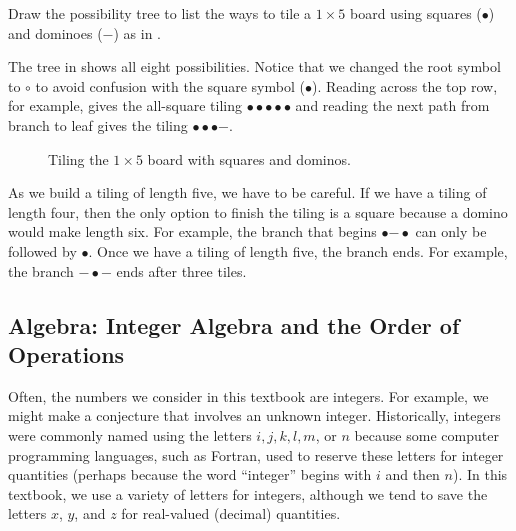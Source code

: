 \begin{exam}
\label{exam_sq_dom5_tree}
    Draw the possibility tree to list the ways to tile a $1 \times 5$ board using squares ($\bullet$) and dominoes ($\boldsymbol{-}$) as in .
        \begin{soln}
            The tree in  shows all eight possibilities.  Notice that we changed the root symbol to $\circ$ to avoid confusion with the square symbol ($\bullet$).  Reading across the top row, for example, gives the all-square tiling $\bullet\bullet\bullet\bullet\bullet$ and reading the next path from branch to leaf gives the tiling $\bullet\bullet\bullet\boldsymbol{-}$.

                \begin{figure}[htbp]
                \centering
                
                \caption{Tiling the $1 \times 5$ board with squares and dominos.}
                \label{fig_sq_dom5}
                \end{figure}

        As we build a tiling of length five, we have to be careful.  If we have a tiling of length four, then the only option to finish the tiling is a square because a domino would make length six. For example, the branch that begins $\bullet\boldsymbol{-}\bullet$ can only be followed by $\bullet$.  Once we have a tiling of length five, the branch ends.  For example, the branch $\boldsymbol{-}\bullet\boldsymbol{-}$ ends after three tiles.
        \end{soln}
\end{exam}


\newcommand{\subintalgebra}{Algebra: Integer Algebra and the Order of Operations}
\subsection{\subintalgebra}
\label{sub_integer_algebra}

Often, the numbers we consider in this textbook are integers. For example, we might make a conjecture that involves an unknown integer. Historically, integers were commonly named using the letters $i,j,k,l,m$, or $n$ because some computer programming languages, such as Fortran, used to reserve these letters for integer quantities (perhaps because the word ``integer'' begins with $i$ and then $n$).  In this textbook, we use a variety of letters for integers, although we tend to save the letters $x$, $y$, and $z$ for real-valued (decimal) quantities.

